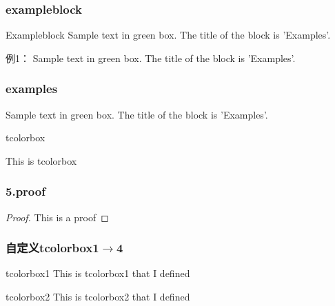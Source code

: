 \begin{frame}
    \frametitle{exampleblock}
	\begin{exampleblock} {Exampleblock}
		Sample text in green box. The title of the block is 'Examples'.
	\end{exampleblock}
    \begin{exampleblock} {例1：}
		Sample text in green box. The title of the block is 'Examples'.
	\end{exampleblock}
\end{frame}

\begin{frame}
    \frametitle{examples}
	\begin{examples}
		Sample text in green box. The title of the block is 'Examples'.
	\end{examples}
\end{frame}

\begin{frame}{tcolorbox}  
  \begin{tcolorbox}[title=5.tcolorbox,colframe=red!75!black]
    This is tcolorbox
  \end{tcolorbox}
\end{frame}

\begin{frame}
    \frametitle{5.proof}
    \begin{proof}{}
      This is a proof
    \end{proof}
\end{frame}

\begin{frame}
    \frametitle{自定义tcolorbox1$\to$4}
    \begin{tcolorbox1}[0.8]{tcolorbox1}
      This is tcolorbox1 that I defined
    \end{tcolorbox1}
    \begin{tcolorbox2}[0.86]{tcolorbox2}
      This is tcolorbox2 that I defined
    \end{tcolorbox2}
\end{frame}
\begin{frame}
  \frametitle{}
  \begin{tcolorbox3}[量子力学基本假设1/5]
    \lipsum[4]
  \end{tcolorbox3}
  \end{frame}
  \begin{frame}    
    \begin{tcolorbox4}[量子力学基本假设1/5]
    \lipsum[4]
    \end{tcolorbox4}
\end{frame}

